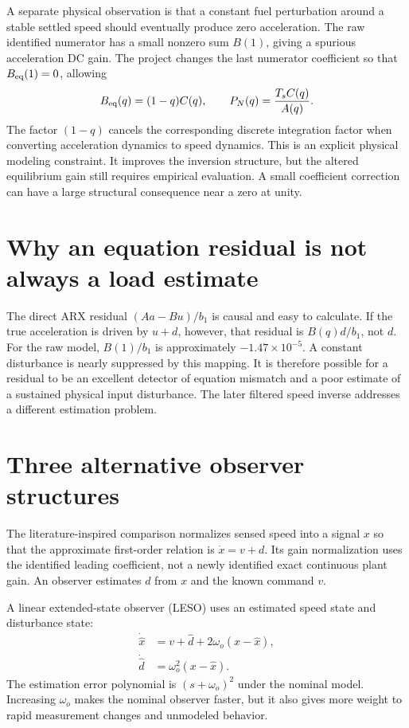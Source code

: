 A separate physical observation is that a constant fuel perturbation around a stable settled speed should eventually produce zero acceleration. The raw identified numerator has a small nonzero sum $B(1)$, giving a spurious acceleration DC gain. The project changes the last numerator coefficient so that $B_{\rm eq}(1)=0$, allowing
\begin{equation}B_{\rm eq}(q)=(1-q)C(q),\qquad
P_N(q)=\frac{T_sC(q)}{A(q)}.
\end{equation}
The factor $(1-q)$ cancels the corresponding discrete integration factor when converting acceleration dynamics to speed dynamics. This is an explicit physical modeling constraint. It improves the inversion structure, but the altered equilibrium gain still requires empirical evaluation. A small coefficient correction can have a large structural consequence near a zero at unity.

\section{Why an equation residual is not always a load estimate}
The direct ARX residual $(Aa-Bu)/b_1$ is causal and easy to calculate. If the true acceleration is driven by $u+d$, however, that residual is $B(q)d/b_1$, not $d$. For the raw model, $B(1)/b_1$ is approximately $-1.47\times10^{-5}$. A constant disturbance is nearly suppressed by this mapping. It is therefore possible for a residual to be an excellent detector of equation mismatch and a poor estimate of a sustained physical input disturbance. The later filtered speed inverse addresses a different estimation problem.

\section{Three alternative observer structures}
The literature-inspired comparison normalizes sensed speed into a signal $x$ so that the approximate first-order relation is $\dot x=v+d$. Its gain normalization uses the identified leading coefficient, not a newly identified exact continuous plant gain. An observer estimates $d$ from $x$ and the known command $v$.

A linear extended-state observer (LESO) uses an estimated speed state and disturbance state:
\begin{align}\dot{\hat x}&=v+\hat d+2\omega_o(x-\hat x),\\
\dot{\hat d}&=\omega_o^2(x-\hat x).
\end{align}
The estimation error polynomial is $(s+\omega_o)^2$ under the nominal model. Increasing $\omega_o$ makes the nominal observer faster, but it also gives more weight to rapid measurement changes and unmodeled behavior.

